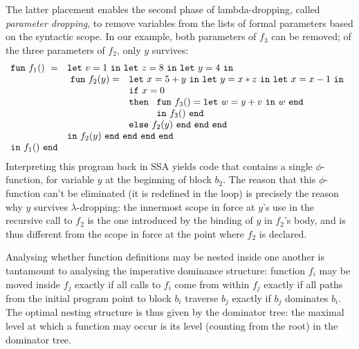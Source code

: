 The latter placement enables the second phase of
lambda-dropping, called
\emph{parameter dropping}, to remove variables from the lists of
formal parameters based on the syntactic scope. In our example, both
parameters of $f_3$ can be removed; of the three parameters of $f_2$,
only $y$ survives:
$$
\begin{array}{ll}
\mathtt{fun}\ f_1()\ = & \mathtt{let}\ v = 1 \ 
                  \mathtt{in\ let}\ z = 8 \ 
                  \mathtt{in\ let}\ y = 4\ \mathtt{in}\\
&\! \begin{array}{ll}
     \mathtt{fun}\ f_2(y) = &
     \mathtt{let}\ x = 5+y\
     \mathtt{in\ let}\ y = x*z\
     \mathtt{in\ let}\ x = x-1\ \mathtt{in}\\
   & \mathtt{if}\ x=0\\ 
   &  \mathtt{then}\ 
      \begin{array}[t]{l}
         \mathtt{fun}\ f_3() = 
         \mathtt{let}\ w = y+v\ \mathtt{in}\ w\ \mathtt{end}\\
         \mathtt{in}\ f_3()\ \mathtt{end}
      \end{array}\\
   & \mathtt{else}\ f_2(y)\ \mathtt{end\ end\ end}
  \end{array}\\
& \mathtt{in}\ f_2(y)\ \mathtt{end\ end\ end\ end}\\
\mathtt{in}\ f_1()\  \mathtt{end}
\end{array}
$$
Interpreting this program back in SSA yields code that
contains a single $\phi$-function, for variable $y$ at the beginning
of block $b_2$. The reason that this $\phi$-function can't be
eliminated (it is redefined in the loop) is precisely the reason why
$y$ survives $\lambda$-dropping: the innermost scope in force at $y$'s
use in the recursive call to $f_2$ is the one introduced by the
binding of $y$ in $f_2$'s body, and is thus different from the scope
in force at the point where $f_2$ is declared.

Analysing whether function definitions may be nested inside one
another is tantamount to analysing the imperative dominance structure:
function $f_i$ may be moved inside $f_j$ exactly if all calls to $f_i$
come from within $f_j$ exactly if all paths from the initial program
point to block $b_i$ traverse $b_j$ exactly if $b_j$ dominates
$b_i$. The optimal nesting structure is thus given by the dominator
tree: the maximal level at which a function may occur is its level
(counting from the root) in the dominator tree.

